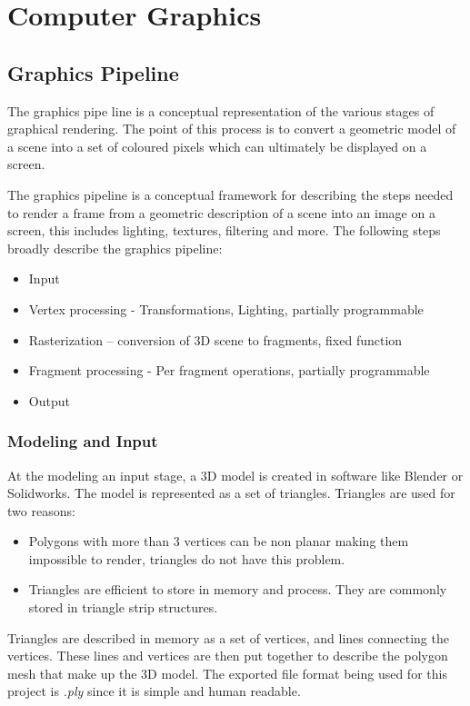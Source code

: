 \section{Computer Graphics}
\subsection{Graphics Pipeline}
The graphics pipe line is a conceptual representation of the various stages of graphical rendering. The point of this process is to convert a geometric model of a scene into a set of coloured pixels which can ultimately be displayed on a screen.

The graphics pipeline is a conceptual framework for describing the steps needed to render a frame from a geometric description of a scene into an image on a screen, this includes lighting, textures, filtering and more. The following steps broadly describe the graphics pipeline\cite{PipelineRegistrationOnGPU}:
\begin{itemize}
    \item Input
    \item Vertex processing - Transformations, Lighting, partially programmable
    \item Rasterization – conversion of 3D scene to fragments, fixed function
    \item Fragment processing - Per fragment operations, partially programmable
    \item Output
\end{itemize}

\subsubsection{Modeling and Input}
At the modeling an input stage, a 3D model is created in software like Blender or Solidworks. The model is represented as a set of triangles. Triangles are used for two reasons:
\begin{itemize}
    \item Polygons with more than 3 vertices can be non planar making them impossible to render, triangles do not have this problem\cite{trianglesInGraphics}.
    \item Triangles are efficient to store in memory and process. They are commonly stored in triangle strip structures\cite{OpenGLSpec}.
    
\end{itemize}
Triangles are described in memory as a set of vertices, and lines connecting the vertices. These lines and vertices are then put together to describe the polygon mesh that make up the 3D model. The exported file format  being used for this project is \textit{.ply}\cite{plyFormat} since it is simple and human readable.


